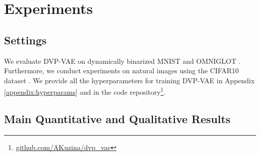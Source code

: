 
\section{Experiments}


\subsection{Settings}
We evaluate DVP-VAE on dynamically binarized MNIST \citep{lecun1998mnist} and OMNIGLOT \citep{lake2015human}. Furthermore, we conduct experiments on natural images using the CIFAR10 dataset \citep{alex2009learning}. We provide all the hyperparameters for training DVP-VAE in Appendix \ref{appendix:hyperparams} and in the code repository\footnote{\url{github.com/AKuzina/dvp_vae}}.
\subsection{Main Quantitative and Qualitative Results}\label{sect:exp_image_generations}

